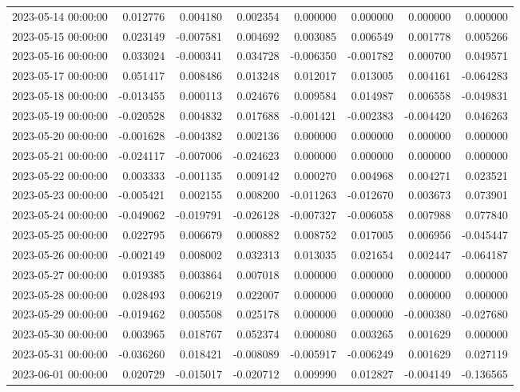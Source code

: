 \begin{tabular}{lrrrrrrr}
2023-05-14 00:00:00 & 0.012776 & 0.004180 & 0.002354 & 0.000000 & 0.000000 & 0.000000 & 0.000000 \\
2023-05-15 00:00:00 & 0.023149 & -0.007581 & 0.004692 & 0.003085 & 0.006549 & 0.001778 & 0.005266 \\
2023-05-16 00:00:00 & 0.033024 & -0.000341 & 0.034728 & -0.006350 & -0.001782 & 0.000700 & 0.049571 \\
2023-05-17 00:00:00 & 0.051417 & 0.008486 & 0.013248 & 0.012017 & 0.013005 & 0.004161 & -0.064283 \\
2023-05-18 00:00:00 & -0.013455 & 0.000113 & 0.024676 & 0.009584 & 0.014987 & 0.006558 & -0.049831 \\
2023-05-19 00:00:00 & -0.020528 & 0.004832 & 0.017688 & -0.001421 & -0.002383 & -0.004420 & 0.046263 \\
2023-05-20 00:00:00 & -0.001628 & -0.004382 & 0.002136 & 0.000000 & 0.000000 & 0.000000 & 0.000000 \\
2023-05-21 00:00:00 & -0.024117 & -0.007006 & -0.024623 & 0.000000 & 0.000000 & 0.000000 & 0.000000 \\
2023-05-22 00:00:00 & 0.003333 & -0.001135 & 0.009142 & 0.000270 & 0.004968 & 0.004271 & 0.023521 \\
2023-05-23 00:00:00 & -0.005421 & 0.002155 & 0.008200 & -0.011263 & -0.012670 & 0.003673 & 0.073901 \\
2023-05-24 00:00:00 & -0.049062 & -0.019791 & -0.026128 & -0.007327 & -0.006058 & 0.007988 & 0.077840 \\
2023-05-25 00:00:00 & 0.022795 & 0.006679 & 0.000882 & 0.008752 & 0.017005 & 0.006956 & -0.045447 \\
2023-05-26 00:00:00 & -0.002149 & 0.008002 & 0.032313 & 0.013035 & 0.021654 & 0.002447 & -0.064187 \\
2023-05-27 00:00:00 & 0.019385 & 0.003864 & 0.007018 & 0.000000 & 0.000000 & 0.000000 & 0.000000 \\
2023-05-28 00:00:00 & 0.028493 & 0.006219 & 0.022007 & 0.000000 & 0.000000 & 0.000000 & 0.000000 \\
2023-05-29 00:00:00 & -0.019462 & 0.005508 & 0.025178 & 0.000000 & 0.000000 & -0.000380 & -0.027680 \\
2023-05-30 00:00:00 & 0.003965 & 0.018767 & 0.052374 & 0.000080 & 0.003265 & 0.001629 & 0.000000 \\
2023-05-31 00:00:00 & -0.036260 & 0.018421 & -0.008089 & -0.005917 & -0.006249 & 0.001629 & 0.027119 \\
2023-06-01 00:00:00 & 0.020729 & -0.015017 & -0.020712 & 0.009990 & 0.012827 & -0.004149 & -0.136565 \\

\end{tabular}
